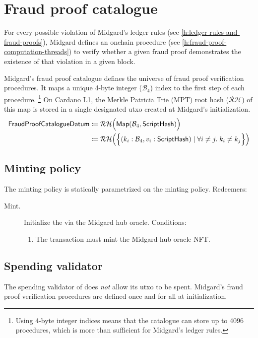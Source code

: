 \documentclass[../midgard.tex]{subfiles}
\begin{document}
\section{Fraud proof catalogue}
\label{h:fraud-proof-catalogue}

For every possible violation of Midgard's ledger rules (see \cref{h:ledger-rules-and-fraud-proofs}), Midgard defines an onchain procedure (see \cref{h:fraud-proof-computation-threads}) to verify whether a given fraud proof demonstrates the existence of that violation in a given block.

Midgard's fraud proof catalogue defines the universe of fraud proof verification procedures.
It maps a unique 4-byte integer ($\mathcal{B}_4$) index to the first step of each procedure.%
\footnote{Using 4-byte integer indices means that the catalogue can store up to 4096 procedures, which is more than sufficient for Midgard's ledger rules.}
On Cardano L1, the Merkle Patricia Trie (MPT) root hash ($\mathcal{RH}$) of this map is stored in a single designated utxo created at Midgard's initialization.
\begin{align*}
  \mathsf{FraudProofCatalogueDatum}
      &\coloneq \mathcal{RH}\Bigl( \mathsf{Map}(\mathcal{B}_4, \mathsf{ScriptHash}) \Bigr) \\
      &\coloneq \mathcal{RH}\Bigl(\Bigl\{
        (k_i: \mathcal{B}_4, v_i: \mathsf{ScriptHash}) \mid \forall i \neq j.\; k_i \neq k_j
    \Bigr\}\Bigr)
\end{align*}

\subsection{Minting policy}
\label{h:fraud-proof-catalogue-minting-policy}

The  minting policy is statically parametrized on the  minting policy.
Redeemers:
\begin{description}
    \item[Mint.] Initialize the  via the Midgard hub oracle.
      Conditions:
        \begin{enumerate}
            \item The transaction must mint the Midgard hub oracle NFT.
        \end{enumerate}
\end{description}

\subsection{Spending validator}
\label{h:fraud-proof-catalogue-spending-validator}

The spending validator of  does \emph{not} allow its utxo to be spent.
Midgard's fraud proof verification procedures are defined once and for all at initialization.
\end{document}
